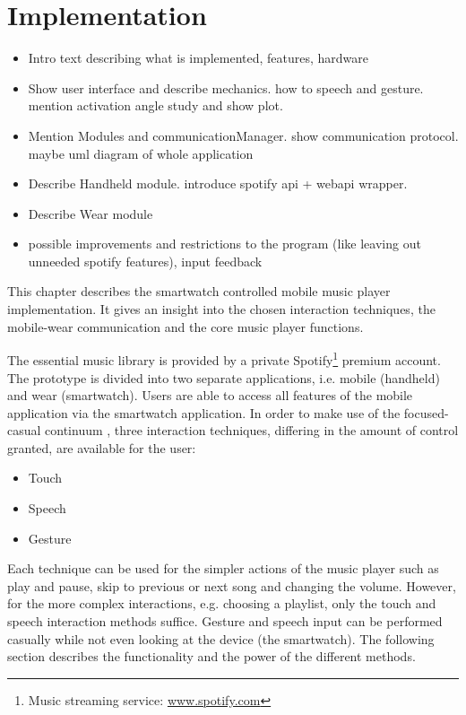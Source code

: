 \chapter{Implementation}\label{ch:implementation}

\begin{itemize}

\item{
	Intro text describing what is implemented, features, hardware
}
\item{
	Show user interface and describe mechanics. how to speech and gesture. mention activation angle study and show plot. 
}
\item{
	Mention Modules and communicationManager. show communication protocol. maybe uml diagram of whole application
}
\item{
	Describe Handheld module. introduce spotify api + webapi wrapper.
}
\item{
	Describe Wear module
}
\item{
	possible improvements and restrictions to the program (like leaving out unneeded spotify features), input feedback
}

\end{itemize}

This chapter describes the smartwatch controlled mobile music player implementation. It gives an insight into the chosen interaction techniques, the mobile-wear communication and the core music player functions.

The essential music library is provided by a private Spotify\footnote{Music streaming service: \url{www.spotify.com}} premium account. The prototype is divided into two separate applications, i.e. mobile (handheld) and wear (smartwatch). Users are able to access all features of the mobile application via the smartwatch application. In order to make use of the focused-casual continuum \cite{pohl2013focused}, three interaction techniques, differing in the amount of control granted, are available for the user:
\begin{itemize}
\item{Touch}
\item{Speech}
\item{Gesture}
\end{itemize}
Each technique can be used for the simpler actions of the music player such as play and pause, skip to previous or next song and changing the volume. However, for the more complex interactions, e.g. choosing a playlist, only the touch and speech interaction methods suffice. Gesture and speech input can be performed casually while not even looking at the device (the smartwatch). The following section describes the functionality and the power of the different methods.

